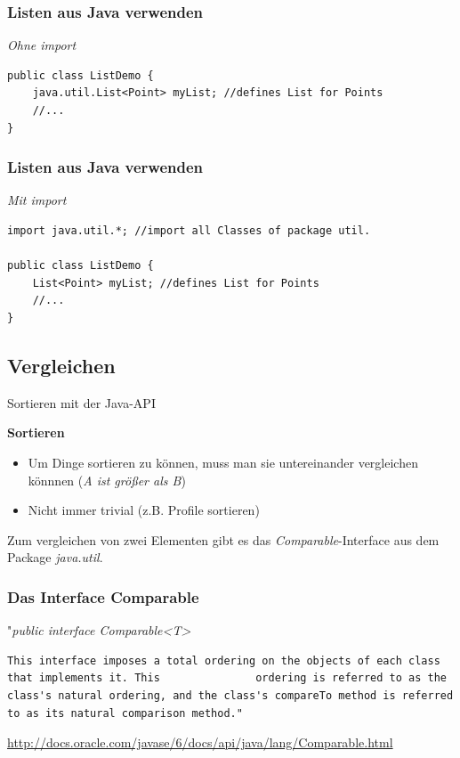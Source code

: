 \documentclass[18pt]{beamer}
\begin{document}

\begin{frame}[containsverbatim]
	\frametitle{Listen aus Java verwenden}
	
	\emph{Ohne import}
	\begin{lstlisting}
public class ListDemo {
	java.util.List<Point> myList; //defines List for Points
	//...
}
	\end{lstlisting}
\end{frame}


\begin{frame}[containsverbatim]
	\frametitle{Listen aus Java verwenden}
	
	\emph{Mit import}
	\begin{lstlisting}
import java.util.*; //import all Classes of package util.

public class ListDemo {
	List<Point> myList; //defines List for Points
	//...
}
	\end{lstlisting}
\end{frame}
\subsection*{Vergleichen}
\begin{frame}{Sortieren mit der Java-API}

	\textbf{Sortieren}
	\begin{itemize}
		\item Um Dinge sortieren zu können, muss man sie untereinander vergleichen könnnen (\emph{A ist größer als B})	
		\item Nicht immer trivial (z.B. Profile sortieren)
	\end{itemize}\pause

	Zum vergleichen von zwei Elementen gibt es das \emph{Comparable}-Interface aus dem Package \emph{java.util}.
	
\end{frame}


\begin{frame}[containsverbatim]
	\frametitle{Das Interface Comparable}
	"\emph{public interface Comparable<T>}\\
	\begin{lstlisting}
This interface imposes a total ordering on the objects of each class that implements it. This 				ordering is referred to as the class's natural ordering, and the class's compareTo method is referred 	to as its natural comparison method."
	\end{lstlisting}

	\url{http://docs.oracle.com/javase/6/docs/api/java/lang/Comparable.html}
\end{frame}
\end{document}
